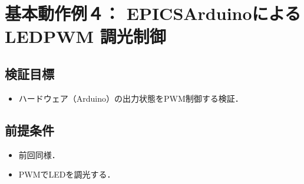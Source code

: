 \documentclass[letterpaper,10pt,dvipdfmx]{sphinxmanual}
\begin{document}
\section{基本動作例４： EPICS\sphinxhyphen{}Arduinoによる LED\sphinxhyphen{}PWM 調光制御}
\label{\detokenize{epics/rst/example4__arduino_LEDcontrol02:epics-arduino-led-pwm}}\label{\detokenize{epics/rst/example4__arduino_LEDcontrol02::doc}}

\subsection{検証目標}
\label{\detokenize{epics/rst/example4__arduino_LEDcontrol02:id1}}\begin{itemize}
\item {} 
ハードウェア（Arduino）の出力状態をPWM制御する検証．

\end{itemize}


\subsection{前提条件}
\label{\detokenize{epics/rst/example4__arduino_LEDcontrol02:id2}}\begin{itemize}
\item {} 
前回同様．

\item {} 
PWMでLEDを調光する．

\end{itemize}
\end{document}
